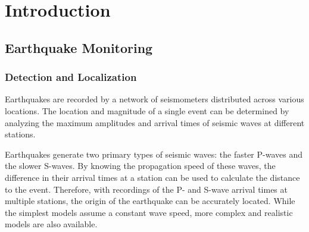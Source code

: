 \documentclass{scrreprt}
\begin{document}
\begin{abstract}
\begin{center}
{\LARGE \sffamily\bfseries Abstract}
\end{center}
This work addresses the challenge of phase association in seismic monitoring under conditions of high event rates and small magnitudes, such as those found at the BedrettoLab Underground Laboratory. Traditional phase association methods often fall short in such complex scenarios due to their inability to handle rapid sequences of seismic events correctly. The effectiveness of various algorithms, including the GaMMA method based on Bayesian Gaussian mixture models and PyOcto, which uses a structured octotree approach, were compared. We generated synthetic datasets reflecting realistic seismic activity to assess performance. Our findings indicate, that while both methods perform well at lower event rates, GaMMA provides superior performance as event rates increase, particularly when configured with refined parameters and adapted to use modified ground motion prediction equations. Moreover, this report proposes modifications to improve these algorithms' applicability to real-world seismic monitoring at geothermal sites and similar settings. 
\end{abstract}

\chapter{Introduction}
\section{Earthquake Monitoring}
\subsection{Detection and Localization}
Earthquakes are recorded by a network of seismometers distributed across various locations. The location and magnitude of a single event can be determined by analyzing the maximum amplitudes and arrival times of seismic waves at different stations.

Earthquakes generate two primary types of seismic waves: the faster P-waves and the slower S-waves. By knowing the propagation speed of these waves, the difference in their arrival times at a station can be used to calculate the distance to the event. Therefore, with recordings of the P- and S-wave arrival times at multiple stations, the origin of the earthquake can be accurately located. While the simplest models assume a constant wave speed, more complex and realistic models are also available.
\end{document}

